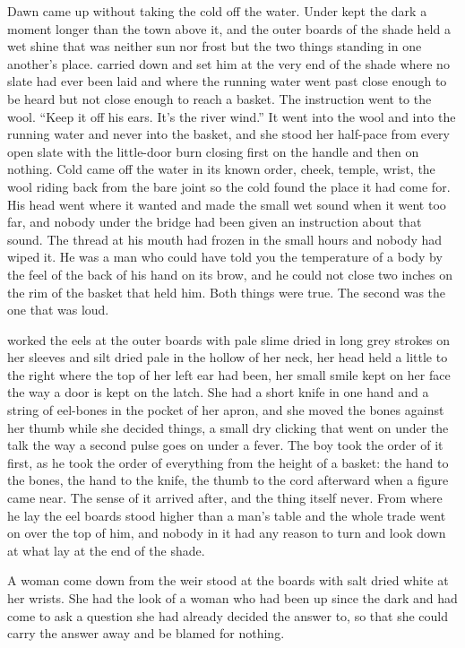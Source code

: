 Dawn came up  without taking the cold off the water. Under   kept the dark a moment longer than the town above it, and the outer boards of the shade held a wet shine that was neither sun nor frost but the two things standing in one another's place.  carried  down and set him at the very end of the shade where no slate had ever been laid and where the running water went past close enough to be heard but not close enough to reach a basket. The instruction went to the wool. “Keep it off his ears. It's the river wind.” It went into the wool and into the running water and never into the basket, and she stood her half-pace from every open slate with the little-door burn closing first on the handle and then on nothing. Cold came off the water in its known order, cheek, temple, wrist, the wool riding back from the bare joint so the cold found the place it had come for. His head went where it wanted and made the small wet sound when it went too far, and nobody under the bridge had been given an instruction about that sound. The thread at his mouth had frozen in the small hours and nobody had wiped it. He was a man who could have told you the temperature of a body by the feel of the back of his hand on its brow, and he could not close two inches on the rim of the basket that held him. Both things were true. The second was the one that was loud.

 worked the eels at the outer boards with pale slime dried in long grey strokes on her sleeves and silt dried pale in the hollow of her neck, her head held a little to the right where the top of her left ear had been, her small smile kept on her face the way a door is kept on the latch. She had a short knife in one hand and a string of eel-bones in the pocket of her apron, and she moved the bones against her thumb while she decided things, a small dry clicking that went on under the talk the way a second pulse goes on under a fever. The boy took the order of it first, as he took the order of everything from the height of a basket: the hand to the bones, the hand to the knife, the thumb to the cord afterward when a figure came near. The sense of it arrived after, and the thing itself never. From where he lay the eel boards stood higher than a man's table and the whole trade went on over the top of him, and nobody in it had any reason to turn and look down at what lay at the end of the shade.

A woman come down from the weir stood at the boards with salt dried white at her wrists. She had the look of a woman who had been up since the dark and had come to ask a question she had already decided the answer to, so that she could carry the answer away and be blamed for nothing.

